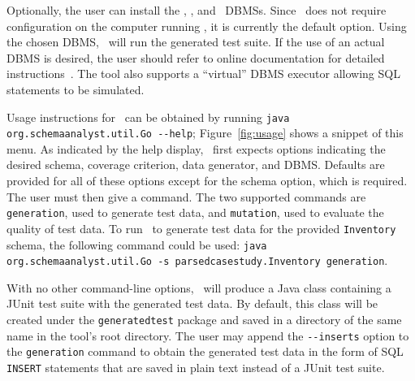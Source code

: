 

Optionally, the user can install the \postgres, \sqlite, and \hypersql~DBMSs. Since \sqlite~does not require
configuration on the computer running \sa, it is currently the default option. Using the chosen DBMS, \sa~will run the
generated test suite. If the use of an actual DBMS is desired, the user should refer to online documentation for detailed
instructions~\cite{tool}. The tool also supports a ``virtual'' DBMS executor allowing SQL statements to be simulated.




Usage instructions for \sa~can be obtained by running \lstinline{java org.schemaanalyst.util.Go --help};
Figure~\ref{fig:usage} shows a snippet of this menu.  As indicated by the help display, \sa~first expects options
indicating the desired schema, coverage criterion, data generator, and DBMS\@. Defaults are provided for all of these
options except for the schema option, which is required. The user must then give a command.  The two supported commands
are \lstinline{generation}, used to generate test data, and \lstinline{mutation}, used to evaluate the quality of test
data.  To run \sa~to generate test data for the provided \texttt{Inventory} schema, the following command could be used:
\lstinline{java org.schemaanalyst.util.Go -s parsedcasestudy.Inventory generation}.


With no other command-line options, \sa~will produce a Java class containing a JUnit test suite with the generated test
data. By default, this class will be created under the \texttt{generatedtest} package and saved in a directory of the same
name in the tool's root directory.  The user may append the \lstinline{--inserts} option to the \lstinline{generation}
command to obtain the generated test data in the form of SQL \texttt{INSERT} statements that are saved in plain text
instead of a JUnit test suite.




